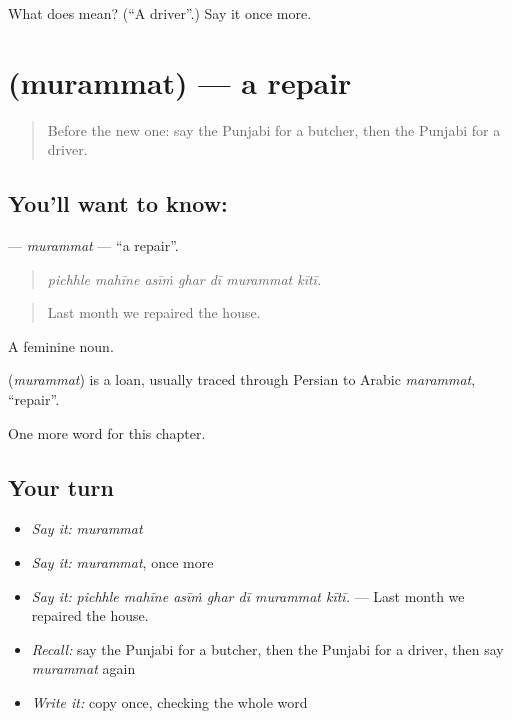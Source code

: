 \begin{tcolorbox}[breakable,colback=teal!4,colframe=teal!35!black,title={Before you move on}]
What does  mean? (\textquotedblleft{}A driver\textquotedblright{}.) Say it once more.
\end{tcolorbox}
\section[\texorpdfstring{\pa{ਮੁਰੰਮਤ} (murammat)}{ਮੁਰੰਮਤ (murammat)}]{ (murammat) — a repair}

\label{lesson:PA-C336-murammat}



\begin{quote}
Before the new one: say the Punjabi for a butcher, then the Punjabi for a driver.
\end{quote}

\subsection*{You'll want to know: }
\textbf{} — \emph{murammat} — \textquotedblleft{}a repair\textquotedblright{}.

\begin{quote}
      
\end{quote}

\begin{quote}
\emph{pichhle mahīne asīṁ ghar dī murammat kītī.}
\end{quote}

\begin{quote}
Last month we repaired the house.
\end{quote}

A feminine noun.

\begin{cousinweb}
\textbf{} (\emph{murammat}) is a loan, usually traced through Persian to Arabic \emph{marammat}, \textquotedblleft{}repair\textquotedblright{}.
\end{cousinweb}

\begin{grammarlens}[title={What you've built}]
One more word for this chapter.
\end{grammarlens}

\subsection*{Your turn}
\begin{itemize}
\raggedright
  \item \emph{Say it:} \emph{murammat}
  \item \emph{Say it:} \emph{murammat}, once more
  \item \emph{Say it:} \emph{pichhle mahīne asīṁ ghar dī murammat kītī.} — Last month we repaired the house.
  \item \emph{Recall:} say the Punjabi for a butcher, then the Punjabi for a driver, then say \emph{murammat} again
  \item \emph{Write it:} copy \textbf{} once, checking the whole word
\end{itemize}

